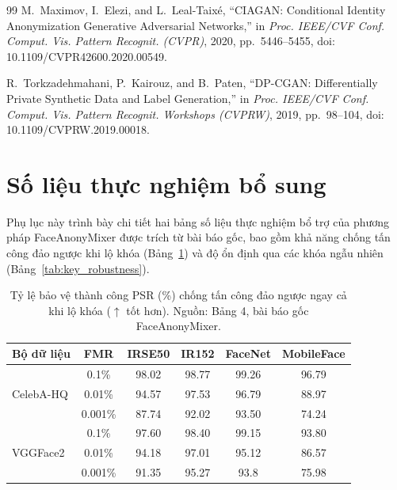 \documentclass[oneside,a4paper,12pt]{extarticle}
\begin{document}
\begin{thebibliography}{99}
M.~Maximov, I.~Elezi, and L.~Leal-Taix{\'e}, ``CIAGAN: Conditional Identity Anonymization Generative Adversarial Networks,'' in \textit{Proc. IEEE/CVF Conf. Comput. Vis. Pattern Recognit. (CVPR)}, 2020, pp.~5446--5455, doi: 10.1109/CVPR42600.2020.00549.

R.~Torkzadehmahani, P.~Kairouz, and B.~Paten, ``DP-CGAN: Differentially Private Synthetic Data and Label Generation,'' in \textit{Proc. IEEE/CVF Conf. Comput. Vis. Pattern Recognit. Workshops (CVPRW)}, 2019, pp.~98--104, doi: 10.1109/CVPRW.2019.00018.

\end{thebibliography}

\clearpage
\appendix

\section{Số liệu thực nghiệm bổ sung}
\label{app:extra_tables}

Phụ lục này trình bày chi tiết hai bảng số liệu thực nghiệm bổ trợ của phương pháp FaceAnonyMixer được trích từ bài báo gốc, bao gồm khả năng chống tấn công đảo ngược khi lộ khóa (Bảng~\ref{tab:noninvertibility}) và độ ổn định qua các khóa ngẫu nhiên (Bảng~\ref{tab:key_robustness}).

\begin{table}[H]
\centering
\small
\setlength{\tabcolsep}{6pt}
\caption[Tỷ lệ bảo vệ thành công PSR chống tấn công đảo ngược khi lộ khóa]{Tỷ lệ bảo vệ thành công PSR (\%) chống tấn công đảo ngược ngay cả khi lộ khóa ($\uparrow$ tốt hơn). Nguồn: Bảng 4, bài báo gốc FaceAnonyMixer.}
\label{tab:noninvertibility}
\begin{tabular}{|l|c|cccc|}
\hline
\textbf{Bộ dữ liệu} & \textbf{FMR} & IRSE50 & IR152 & FaceNet & MobileFace \\
\hline
\multirow{3}{*}{CelebA-HQ} & 0.1\% & 98.02 & 98.77 & 99.26 & 96.79 \\
 & 0.01\% & 94.57 & 97.53 & 96.79 & 88.97 \\
 & 0.001\% & 87.74 & 92.02 & 93.50 & 74.24 \\
\hline
\multirow{3}{*}{VGGFace2} & 0.1\% & 97.60 & 98.40 & 99.15 & 93.80 \\
 & 0.01\% & 94.18 & 97.01 & 95.12 & 86.57 \\
 & 0.001\% & 91.35 & 95.27 & 93.8 & 75.98 \\
\hline
\end{tabular}
\end{table}
\end{document}
